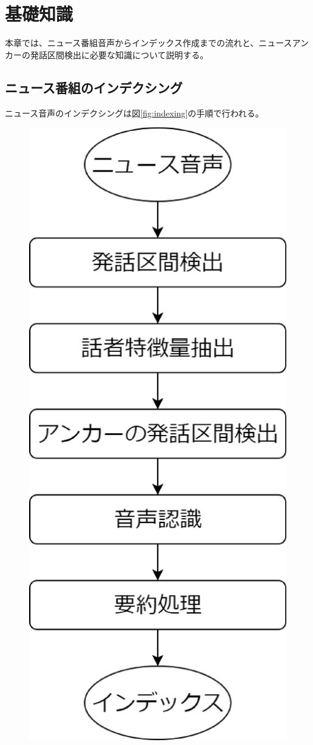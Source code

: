 \chapter{基礎知識}
\label{chapter:kisotisiki}
本章では、ニュース番組音声からインデックス作成までの流れと、ニュースアンカーの発話区間検出に必要な知識について説明する。
\section{ニュース番組のインデクシング\cite{indexing_flow}}
ニュース音声のインデクシングは図\ref{fig:indexing}の手順で行われる。

\begin{figure}[H]
  \begin{center}
    \includegraphics[scale=0.3]{./figure/indexing.eps}

\end{center}
\end{figure}
